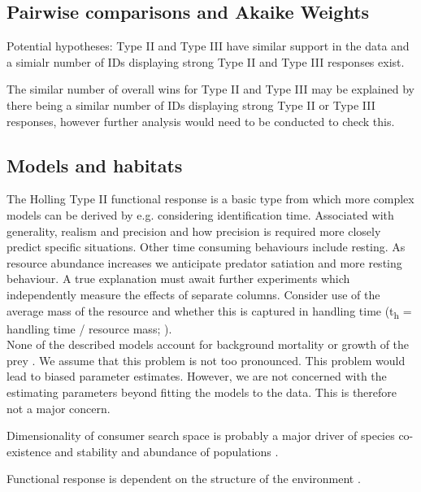 \documentclass[11pt]{article}
\begin{document}
            \subsection{Pairwise comparisons and Akaike Weights}

                Potential hypotheses: Type II and Type III have similar support in the data and a simialr number of IDs displaying strong Type II and Type III responses exist.

                The similar number of overall wins for Type II and Type III may be explained by there being a similar number of IDs displaying strong Type II or Type III responses, however further analysis would need to be conducted to check this.
            
            \subsection{Models and habitats}

                The Holling Type II functional response is a basic type from which more complex models can be derived by e.g. considering identification time. Associated with generality, realism and precision \citep{levins1966strategy} and how precision is required more closely predict specific situations. Other time consuming behaviours include resting. As resource abundance increases we anticipate predator satiation and more resting behaviour. A true explanation must await further experiments which independently measure the effects of separate columns. Consider use of the average mass of the resource and whether this is captured in handling time (t\textsubscript{h} = handling time / resource mass; \citep{pawar2012dimensionality}).\\

                None of the described models account for background mortality or growth of the prey \citep{rosenbaum2018fitting}. We assume that this problem is not too pronounced. This problem would lead to biased parameter estimates. However, we are not concerned with the estimating parameters beyond fitting the models to the data. This is therefore not a major concern.

                Dimensionality of consumer search space is probably a major driver of species co-existence and stability and abundance of populations \citep{pawar2012dimensionality}.

                Functional response is dependent on the structure of the environment \citep{hohberg2005predator}.
            
\end{document}
